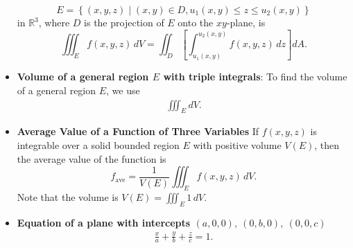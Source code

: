 \documentclass{report}
\begin{document}
\begin{itemize}
            \[
                E = \left\{ (x,y,z) \mid (x,y) \in D, u_1(x,y) \leq z \leq u_2(x,y) \right\}
            \]
            in $\mathbb{R}^3$, where $D$ is the projection of $E$ onto the $xy$-plane, is
            \[
                \iiint_E f(x,y,z) \, dV = \iint_D \left[ \int_{u_1(x,y)}^{u_2(x,y)} f(x,y,z) \, dz \right] dA.
            \]
        \item \textbf{Volume of a general region $E$ with triple integrals}: To find the volume of a general  region $E$, we use
            \begin{align*}
                \iiint_E dV
            .\end{align*}
        \item \textbf{Average Value of a Function of Three Variables}
            If $f(x,y,z)$ is integrable over a solid bounded region $E$ with positive volume $V(E)$, then the average value of the function is
            \[
                f_{\text{ave}} = \frac{1}{V(E)} \iiint_E f(x,y,z) \, dV.
            \]
            Note that the volume is $V(E) = \iiint_E 1 \, dV$.
        \item \textbf{Equation of a plane with intercepts $(a,0,0),\ (0,b,0),\ (0,0,c) $}
            \begin{align*}
                \frac{x}{a} + \frac{y}{b} + \frac{z}{c} = 1
            .\end{align*}









 









 






    \end{itemize}
\end{document}
